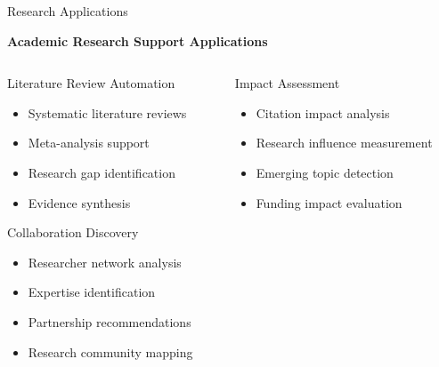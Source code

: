 \documentclass[aspectratio=169]{beamer}
\begin{document}
\begin{frame}{Research Applications}
    \begin{center}
        \textbf{Academic Research Support Applications}
    \end{center}
    
    \vspace{0.5cm}
    
    \begin{columns}[c]
        \begin{column}{0.5\textwidth}
            \begin{block}{Literature Review Automation}
                \begin{itemize}
                    \item Systematic literature reviews
                    \item Meta-analysis support
                    \item Research gap identification
                    \item Evidence synthesis
                \end{itemize}
            \end{block}
            
            \begin{block}{Collaboration Discovery}
                \begin{itemize}
                    \item Researcher network analysis
                    \item Expertise identification
                    \item Partnership recommendations
                    \item Research community mapping
                \end{itemize}
            \end{block}
        \end{column}
        \begin{column}{0.5\textwidth}
            \begin{block}{Impact Assessment}
                \begin{itemize}
                    \item Citation impact analysis
                    \item Research influence measurement
                    \item Emerging topic detection
                    \item Funding impact evaluation
                \end{itemize}
            \end{block}
            

\end{column}
\end{columns}
\end{frame}
\end{document}
